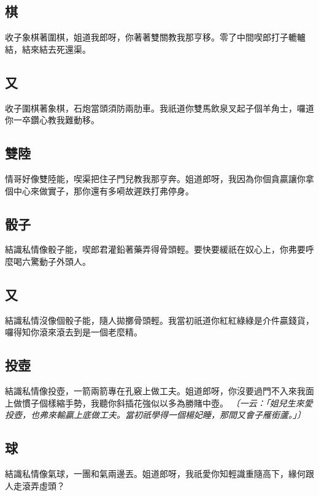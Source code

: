 \subsection*{棋}

收子象棋著圍棋，姐道我郎呀，你著著雙關教我那亨移。零了中間喫郎打子轆轤結，結來結去死還渠。

\subsection*{又}

收子圍棋著象棋，石炮當頭須防兩肋車。我祇道你雙馬飲泉叉起子個羊角士，囉道你一卒鑽心教我難動移。

\subsection*{雙陸}

情哥好像雙陸能，喫渠把住子門兒教我那亨奔。姐道郎呀，我因為你個貪贏讓你拿個中心來做實子，那你還有多嗬故遲跌打弗停身。

\subsection*{骰子}

結識私情像骰子能，喫郎君灌鉛著藥弄得骨頭輕。要快要緩祇在奴心上，你弗要呼麼喝六驚動子外頭人。

\subsection*{又}

結識私情沒像個骰子能，隨人拋擲骨頭輕。我當初祇道你紅紅綠綠是介件贏錢貨，囉得知你滾來滾去到是一個老麼精。

\subsection*{投壺}

結識私情像投壺，一箭兩箭專在孔竅上做工夫。姐道郎呀，你沒要過門不入來我面上做慣子個樣縮手勢，我聽你斜插花強似以多為勝賭中壺。
\textit{〔一云：「姐兒生來愛投壺，也弗來輸贏上底做工夫。當初祇學得一個楊妃睡，那間又會子雁銜蘆。」〕}

\subsection*{球}

結識私情像氣球，一團和氣兩邊丟。姐道郎呀，我祇愛你知輕識重隨高下，緣何跟人走滾弄虛頭？

